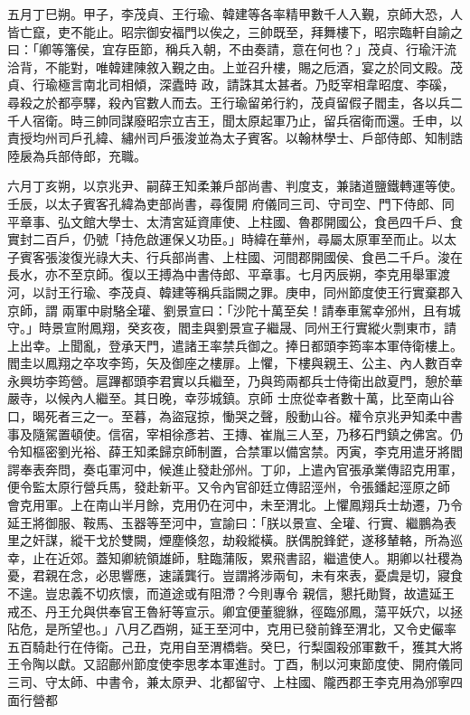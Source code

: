 \begin{pinyinscope}
 五月丁巳朔。甲子，李茂貞、王行瑜、韓建等各率精甲數千人入覲，京師大恐，人皆亡竄，吏不能止。昭宗御安福門以俟之，三帥既至，拜舞樓下，昭宗臨軒自諭之曰：「卿等籓侯，宜存臣節，稱兵入朝，不由奏請，意在何也？」茂貞、行瑜汗流洽背，不能對，唯韓建陳敘入覲之由。上並召升樓，賜之卮酒，宴之於同文殿。茂貞、行瑜極言南北司相傾，深蠹時
 政，請誅其太甚者。乃貶宰相韋昭度、李磎，尋殺之於都亭驛，殺內官數人而去。王行瑜留弟行約，茂貞留假子閻圭，各以兵二千人宿衛。時三帥同謀廢昭宗立吉王，聞太原起軍乃止，留兵宿衛而還。壬申，以責授均州司戶孔緯、繡州司戶張浚並為太子賓客。以翰林學士、戶部侍郎、知制誥陸扆為兵部侍郎，充職。



 六月丁亥朔，以京兆尹、嗣薛王知柔兼戶部尚書、判度支，兼諸道鹽鐵轉運等使。壬辰，以太子賓客孔緯為吏部尚書，尋復開
 府儀同三司、守司空、門下侍郎、同平章事、弘文館大學士、太清宮延資庫使、上柱國、魯郡開國公，食邑四千戶、食實封二百戶，仍號「持危啟運保乂功臣。」時緯在華州，尋屬太原軍至而止。以太子賓客張浚復光祿大夫、行兵部尚書、上柱國、河間郡開國侯、食邑二千戶。浚在長水，亦不至京師。復以王搏為中書侍郎、平章事。七月丙辰朔，李克用舉軍渡河，以討王行瑜、李茂貞、韓建等稱兵詣闕之罪。庚申，同州節度使王行實棄郡入京師，謂
 兩軍中尉駱全瓘、劉景宣曰：「沙陀十萬至矣！請奉車駕幸邠州，且有城守。」時景宣附鳳翔，癸亥夜，閻圭與劉景宣子繼晟、同州王行實縱火剽東市，請上出幸。上聞亂，登承天門，遣諸王率禁兵御之。捧日都頭李筠率本軍侍衛樓上。閻圭以鳳翔之卒攻李筠，矢及御座之樓扉。上懼，下樓與親王、公主、內人數百幸永興坊李筠營。扈蹕都頭李君實以兵繼至，乃與筠兩都兵士侍衛出啟夏門，憩於華嚴寺，以候內人繼至。其日晚，幸莎城鎮。京師
 士庶從幸者數十萬，比至南山谷口，暍死者三之一。至暮，為盜寇掠，慟哭之聲，殷動山谷。權令京兆尹知柔中書事及隨駕置頓使。信宿，宰相徐彥若、王摶、崔胤三人至，乃移石門鎮之佛宮。仍令知樞密劉光裕、薛王知柔歸京師制置，合禁軍以備宮禁。丙寅，李克用遣牙將閻諤奉表奔問，奏屯軍河中，候進止發赴邠州。丁卯，上遣內官張承業傳詔克用軍，便令監太原行營兵馬，發赴新平。又令內官卻廷立傳詔涇州，令張鐇起涇原之師
 會克用軍。上在南山半月餘，克用仍在河中，未至渭北。上懼鳳翔兵士劫遷，乃令延王將御服、鞍馬、玉器等至河中，宣諭曰：「朕以景宣、全瓘、行實、繼鵬為表里之奸謀，縱干戈於雙闕，煙塵倏忽，劫殺縱橫。朕偶脫鋒鋩，遂移輦輅，所為巡幸，止在近郊。蓋知卿統領雄師，駐臨蒲阪，累飛書詔，繼遣使人。期卿以社稷為憂，君親在念，必思響應，速議龔行。豈謂將涉兩旬，未有來表，憂虞是切，寢食不遑。豈忠義不切疚懷，而道途或有阻滯？今則專令
 親信，懇托勛賢，故遣延王戒丕、丹王允與供奉官王魯紆等宣示。卿宜便董貔貅，徑臨邠鳳，蕩平妖穴，以拯阽危，是所望也。」八月乙酉朔，延王至河中，克用已發前鋒至渭北，又令史儼率五百騎赴行在侍衛。己丑，克用自至渭橋砦。癸巳，行梨園殺邠軍數千，獲其大將王令陶以獻。又詔鄜州節度使李思孝本軍進討。丁酉，制以河東節度使、開府儀同三司、守太師、中書令，兼太原尹、北都留守、上柱國、隴西郡王李克用為邠寧四面行營都

\end{pinyinscope}

